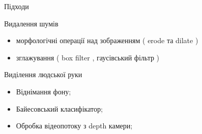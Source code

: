 \begin{frame}{Підходи}\manimate
	\begin{block}{Видалення шумів}
		\begin{itemize}
			\item морфологічні операції над зображенням ( erode та dilate )
			\item зглажування ( box filter , гаусівський фільтр )
		\end{itemize}
	\end{block}
	\begin{block}{Виділення людської руки}
		\begin{itemize}
			\item Віднімання фону;
			\item Байесовський класифікатор;
			\item Обробка відеопотоку з depth камери;
		\end{itemize}
	\end{block}	
\end{frame}